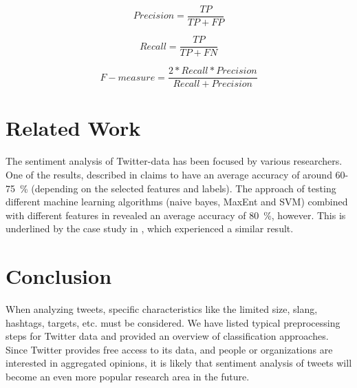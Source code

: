 \documentclass{acm_proc_article-sp}
\begin{document}
\begin{equation} Precision = \frac{TP}{TP+FP} \end{equation}

\begin{equation} Recall = \frac{TP}{TP+FN} \end{equation}

\begin{equation} F-measure = \frac{2*Recall*Precision}{Recall+Precision}
\end{equation}


\section{Related Work} \label{related} The sentiment analysis of Twitter-data
has been focused by various researchers. One of the results, described in
\cite{agarwal2011sentiment} claims to have an average accuracy of around
60-75~\% (depending on the selected features and labels).  The approach of
testing different machine learning algorithms (naive bayes, MaxEnt and SVM)
combined with different features in \cite{go2009twitter} revealed an average
accuracy of 80~\%, however. This is underlined by the case study in
\cite{lin2012large}, which experienced a similar result.

\section{Conclusion} \label{conclusion} When analyzing tweets, specific
characteristics like the limited size, slang, hashtags, targets, etc. must be
considered. We have listed typical preprocessing steps for Twitter data and
provided an overview of classification approaches.  Since Twitter provides free
access to its data, and people or organizations are interested in aggregated
opinions, it is likely that sentiment analysis of tweets will become an even
more popular research area in the future.



%

%
%
\end{document}
